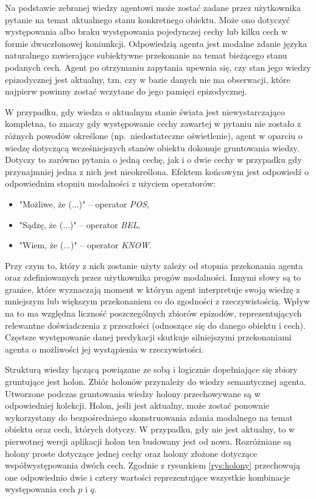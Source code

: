 Na podstawie zebranej wiedzy agentowi może zostać zadane przez użytkownika pytanie na temat aktualnego stanu konkretnego obiektu. Może ono dotyczyć występowania albo braku występowania pojedynczej cechy lub kilku cech w formie dwuczłonowej koniunkcji. Odpowiedzią agenta jest modalne zdanie języka naturalnego zawierające subiektywne przekonanie na temat bieżącego stanu podanych cech. Agent po otrzymaniu zapytania upewnia się, czy stan jego wiedzy epizodycznej jest aktualny, tzn. czy w bazie danych nie ma obserwacji, które najpierw powinny zostać wczytane do jego pamięci epizodycznej.

W przypadku, gdy wiedza o aktualnym stanie świata jest niewystarczająco kompletna, to znaczy gdy występowanie cechy zawartej w pytaniu nie zostało z różnych powodów określone (np.\ niedostateczne oświetlenie), agent w oparciu o wiedzę dotyczącą wcześniejszych stanów obiektu dokonuje gruntowania wiedzy. Dotyczy to zarówno pytania o jedną cechę, jak i o dwie cechy w przypadku gdy przynajmniej jedna z nich jest nieokreślona. Efektem końcowym jest odpowiedź o odpowiednim stopniu modalności z użyciem operatorów: 

\begin{itemize}
	\setlength{\itemindent}{.5in}
	\item "Możliwe, że (...)" -- operator \textit{POS},
	\item "Sądzę, że (...)" -- operator \textit{BEL},
	\item "Wiem, że (...)" -- operator \textit{KNOW}.
\end{itemize}  

Przy czym to, który z nich zostanie użyty zależy od stopnia przekonania agenta oraz zdefiniowanych przez użytkownika progów modalności. Innymi słowy są to granice, które wyznaczają moment w którym agent interpretuje swoją wiedzę z mniejszym lub większym przekonaniem co do zgodności z rzeczywistością. Wpływ na to ma względna liczność poszczególnych zbiorów epizodów, reprezentujących relewantne doświadczenia z przeszłości (odnoszące się do danego obiektu i cech). Częstsze występowanie danej predykacji skutkuje silniejszymi przekonaniami agenta o możliwości jej wystąpienia w rzeczywistości.

Strukturą wiedzy łączącą powiązane ze sobą i logicznie dopełniające się zbiory gruntujące jest holon. Zbiór holonów przynależy do wiedzy semantycznej agenta. Utworzone podczas gruntowania wiedzy holony przechowywane są w odpowiedniej kolekcji. Holon, jeśli jest aktualny, może zostać ponownie wykorzystany do bezpośredniego skonstruowania zdania modalnego na temat obiektu oraz cech, których dotyczy. W przypadku, gdy nie jest aktualny, to w pierwotnej wersji aplikacji holon ten budowany jest od nowa. Rozróżniane są holony proste dotyczące jednej cechy oraz holony złożone dotyczące współwystępowania dwóch cech. Zgodnie z rysunkiem \ref{rys:holony} przechowują one odpowiednio dwie i cztery wartości reprezentujące wszystkie kombinacje występowania cech $ p $ i $ q $.

